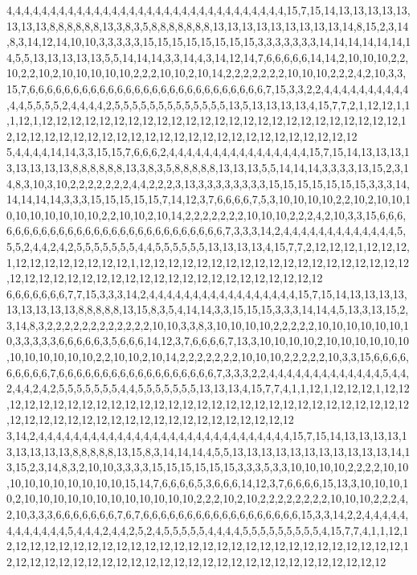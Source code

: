 4,4,4,4,4,4,4,4,4,4,4,4,4,4,4,4,4,4,4,4,4,4,4,4,4,4,4,4,4,4,4,4,15,7,15,14,13,13,13,13,13,13,13,13,8,8,8,8,8,8,13,3,8,3,5,8,8,8,8,8,8,8,13,13,13,13,13,13,13,13,13,14,8,15,2,3,14,8,3,14,12,14,10,10,3,3,3,3,3,15,15,15,15,15,15,15,15,3,3,3,3,3,3,3,14,14,14,14,14,14,14,5,5,13,13,13,13,13,5,5,14,14,14,3,3,14,4,3,14,12,14,7,6,6,6,6,6,14,14,2,10,10,10,2,2,10,2,2,10,2,10,10,10,10,10,2,2,2,10,10,2,10,14,2,2,2,2,2,2,2,10,10,10,2,2,2,4,2,10,3,3,15,7,6,6,6,6,6,6,6,6,6,6,6,6,6,6,6,6,6,6,6,6,6,6,6,6,6,6,6,7,15,3,3,2,2,4,4,4,4,4,4,4,4,4,4,4,4,5,5,5,5,2,4,4,4,4,2,5,5,5,5,5,5,5,5,5,5,5,5,5,13,5,13,13,13,13,4,15,7,7,2,1,12,12,1,1,1,12,1,12,12,12,12,12,12,12,12,12,12,12,12,12,12,12,12,12,12,12,12,12,12,12,12,12,12,12,12,12,12,12,12,12,12,12,12,12,12,12,12,12,12,12,12,12,12,12,12,12,12
5,4,4,4,4,14,14,3,3,15,15,7,6,6,6,2,4,4,4,4,4,4,4,4,4,4,4,4,4,4,4,4,15,7,15,14,13,13,13,13,13,13,13,13,8,8,8,8,8,8,13,3,8,3,5,8,8,8,8,8,13,13,13,5,5,14,14,14,3,3,3,3,13,15,2,3,14,8,3,10,3,10,2,2,2,2,2,2,2,4,4,2,2,2,3,13,3,3,3,3,3,3,3,3,15,15,15,15,15,15,15,3,3,3,14,14,14,14,14,3,3,3,15,15,15,15,15,7,14,12,3,7,6,6,6,6,7,5,3,10,10,10,10,2,2,10,2,10,10,10,10,10,10,10,10,10,2,2,10,10,2,10,14,2,2,2,2,2,2,2,10,10,10,2,2,2,4,2,10,3,3,15,6,6,6,6,6,6,6,6,6,6,6,6,6,6,6,6,6,6,6,6,6,6,6,6,6,6,6,6,7,3,3,3,14,2,4,4,4,4,4,4,4,4,4,4,4,4,4,5,5,5,2,4,4,2,4,2,5,5,5,5,5,5,5,4,4,5,5,5,5,5,5,13,13,13,13,4,15,7,7,2,12,12,12,1,12,12,12,1,12,12,12,12,12,12,12,12,1,12,12,12,12,12,12,12,12,12,12,12,12,12,12,12,12,12,12,12,12,12,12,12,12,12,12,12,12,12,12,12,12,12,12,12,12,12,12,12,12,12
6,6,6,6,6,6,6,7,7,15,3,3,3,14,2,4,4,4,4,4,4,4,4,4,4,4,4,4,4,4,4,4,15,7,15,14,13,13,13,13,13,13,13,13,13,8,8,8,8,8,13,15,8,3,5,4,14,14,3,3,15,15,15,3,3,3,14,14,4,5,13,3,13,15,2,3,14,8,3,2,2,2,2,2,2,2,2,2,2,2,2,10,10,3,3,8,3,10,10,10,10,2,2,2,2,2,10,10,10,10,10,10,10,3,3,3,3,3,6,6,6,6,6,3,5,6,6,6,14,12,3,7,6,6,6,6,7,13,3,10,10,10,10,2,10,10,10,10,10,10,10,10,10,10,10,10,2,2,10,10,2,10,14,2,2,2,2,2,2,2,10,10,10,2,2,2,2,2,10,3,3,15,6,6,6,6,6,6,6,6,6,7,6,6,6,6,6,6,6,6,6,6,6,6,6,6,6,6,6,6,7,3,3,3,2,2,4,4,4,4,4,4,4,4,4,4,4,4,4,5,4,4,2,4,4,2,4,2,5,5,5,5,5,5,5,4,4,5,5,5,5,5,5,5,13,13,13,4,15,7,7,4,1,1,12,1,12,12,12,1,12,12,12,12,12,12,12,12,12,12,12,12,12,12,12,12,12,12,12,12,12,12,12,12,12,12,12,12,12,12,12,12,12,12,12,12,12,12,12,12,12,12,12,12,12,12,12,12,12,12
3,14,2,4,4,4,4,4,4,4,4,4,4,4,4,4,4,4,4,4,4,4,4,4,4,4,4,4,4,4,4,4,15,7,15,14,13,13,13,13,13,13,13,13,13,8,8,8,8,8,13,15,8,3,14,14,14,4,5,5,13,13,13,13,13,13,13,13,13,13,13,14,13,15,2,3,14,8,3,2,10,10,3,3,3,3,15,15,15,15,15,15,3,3,3,5,3,3,10,10,10,10,2,2,2,2,10,10,10,10,10,10,10,10,10,10,15,14,7,6,6,6,6,5,3,6,6,6,14,12,3,7,6,6,6,6,15,13,3,10,10,10,10,2,10,10,10,10,10,10,10,10,10,10,10,10,2,2,2,10,2,10,2,2,2,2,2,2,2,2,10,10,10,2,2,2,4,2,10,3,3,3,6,6,6,6,6,6,6,7,6,7,6,6,6,6,6,6,6,6,6,6,6,6,6,6,6,6,6,6,15,3,3,14,2,2,4,4,4,4,4,4,4,4,4,4,4,4,5,4,4,4,2,4,4,2,5,2,4,5,5,5,5,5,4,4,4,4,5,5,5,5,5,5,5,5,5,4,15,7,7,4,1,1,12,12,12,12,12,12,12,12,12,12,12,12,12,12,12,12,12,12,12,12,12,12,12,12,12,12,12,12,12,12,12,12,12,12,12,12,12,12,12,12,12,12,12,12,12,12,12,12,12,12,12,12,12,12,12,12
